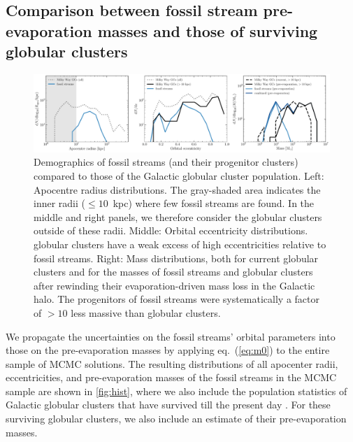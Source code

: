\documentclass[twocolumn]{aastex63}
\begin{document}
\subsection{Comparison between fossil stream pre-evaporation masses and those of surviving globular clusters}
\begin{figure}
\includegraphics[width=\hsize]{figures/distributions_mc.pdf}%
\caption{
\label{fig:hist}
Demographics of fossil streams (and their progenitor clusters) compared to those of the Galactic globular cluster population. Left: Apocentre radius distributions. The gray-shaded area indicates the inner radii ($\leq10$~kpc) where few fossil streams are found. In the middle and right panels, we therefore consider the globular clusters outside of these radii. Middle: Orbital eccentricity distributions. globular clusters have a weak excess of high eccentricities relative to fossil streams. Right: Mass distributions, both for current globular clusters and for the masses of fossil streams and globular clusters after rewinding their evaporation-driven mass loss in the Galactic halo. The progenitors of fossil streams were systematically a factor of $>10$ less massive than globular clusters.}
\end{figure}	
We propagate the uncertainties on the fossil streams' orbital parameters into those on the pre-evaporation masses by applying eq.~(\ref{eq:m0}) to the entire sample of MCMC solutions. The resulting distributions of all apocenter radii, eccentricities, and pre-evaporation masses of the fossil streams in the MCMC sample are shown in \autoref{fig:hist}, where we also include the population statistics of Galactic globular clusters that have survived till the present day \citep[2010 edition]{harris96}. For these surviving globular clusters, we also include an estimate of their pre-evaporation masses.
\end{document}
